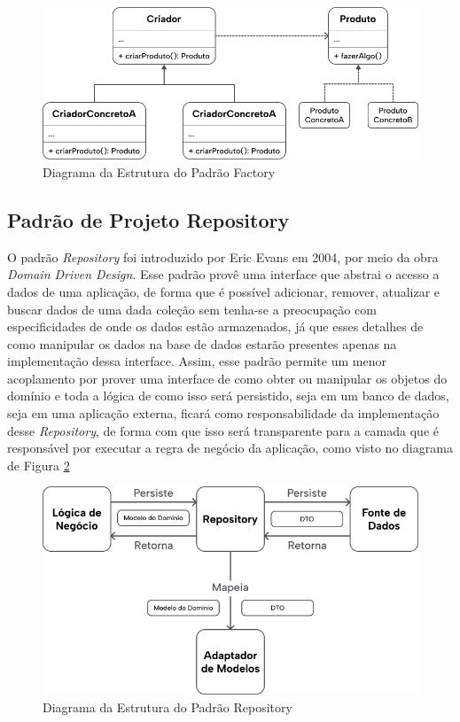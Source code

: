 \documentclass[12pt, %
openright, 
oneside, %
a4paper,    %
brazil]{facom-ufu-abntex2}
\begin{document}
\begin{figure}[ht]
    \centering
    \includegraphics[width=.65\textwidth]{figures/design_patterns/factory_diagram.png}
    \caption{Diagrama da Estrutura do Padrão Factory}
    \label{fig:factory_diagram}
\end{figure}

\subsection{Padrão de Projeto Repository}
O padrão \textit{Repository} foi introduzido por Eric Evans em 2004, por meio da obra \textit{Domain Driven Design}. Esse padrão provê uma interface que abstrai o acesso a dados de uma aplicação, de forma que é possível adicionar, remover, atualizar e buscar dados de uma dada coleção sem tenha-se a preocupação com especificidades de onde os dados estão armazenados, já que esses detalhes de como manipular os dados na base de dados estarão presentes apenas na implementação dessa interface. Assim, esse padrão permite um menor acoplamento por prover uma interface de como obter ou manipular os objetos do domínio e toda a lógica de como isso será persistido, seja em um banco de dados, seja em uma aplicação externa, ficará como responsabilidade da implementação desse \textit{Repository}, de forma com que isso será transparente para a camada que é responsável por executar a regra de negócio da aplicação, como visto no diagrama de Figura \ref{fig:repository_diagram}

\begin{figure}[ht]
    \centering
    \includegraphics[width=.65\textwidth]{figures/design_patterns/repository_diagram.png}
    \caption{Diagrama da Estrutura do Padrão Repository}
    \label{fig:repository_diagram}
\end{figure}
\end{document}

